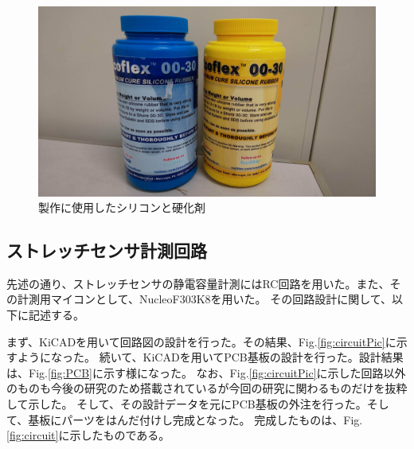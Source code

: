 \begin{figure}[h]
    \begin{center}
        \includegraphics[width=0.6\columnwidth,clip]{./2_measurement/silicon.eps}
        \caption{製作に使用したシリコンと硬化剤}
        \label{fig:silicon}
    \end{center}
\end{figure}

\newpage
\subsection{ストレッチセンサ計測回路}

先述の通り、ストレッチセンサの静電容量計測にはRC回路を用いた。また、その計測用マイコンとして、NucleoF303K8を用いた。
その回路設計に関して、以下に記述する。

まず、KiCADを用いて回路図の設計を行った。その結果、Fig.\ref{fig:circuitPic}に示すようになった。
続いて、KiCADを用いてPCB基板の設計を行った。設計結果は、Fig.\ref{fig:PCB}に示す様になった。
なお、Fig.\ref{fig:circuitPic}に示した回路以外のものも今後の研究のため搭載されているが今回の研究に関わるものだけを抜粋して示した。
そして、その設計データを元にPCB基板の外注を行った。そして、基板にパーツをはんだ付けし完成となった。
完成したものは、Fig.\ref{fig:circuit}に示したものである。

